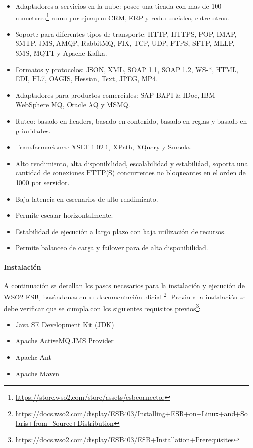 \begin{itemize}
  \item Adaptadores a servicios en la nube: posee una tienda con mas de 100 conectores\footnote{\url{https://store.wso2.com/store/assets/esbconnector}} como por ejemplo: CRM, ERP y redes sociales, entre otros.
  \item Soporte para diferentes tipos de transporte: HTTP, HTTPS, POP, IMAP, SMTP, JMS, AMQP, RabbitMQ, FIX, TCP, UDP, FTPS, SFTP, MLLP, SMS, MQTT y Apache Kafka.
  \item Formatos y protocolos: JSON, XML, SOAP 1.1, SOAP 1.2, WS-*, HTML, EDI, HL7, OAGIS, Hessian, Text, JPEG, MP4.
  \item Adaptadores para productos comerciales: SAP BAPI \& IDoc, IBM WebSphere MQ, Oracle AQ y MSMQ.
  \item Ruteo: basado en headers, basado en contenido, basado en reglas y basado en prioridades.
  \item Transformaciones: XSLT 1.0\/2.0, XPath, XQuery y Smooks.
  \item Alto rendimiento, alta disponibilidad, escalabilidad y estabilidad, soporta una cantidad de conexiones HTTP(S) concurrentes no bloqueantes en el orden de 1000 por servidor.
  \item Baja latencia en escenarios de alto rendimiento.
  \item Permite escalar horizontalmente.
  \item Estabilidad de ejecución a largo plazo con baja utilización de recursos.
  \item Permite balanceo de carga y failover para  de alta disponibilidad.
\end{itemize}


\paragraph{Instalación}

A continuación se detallan los pasos necesarios para la instalación y ejecución de WSO2 ESB, basándonos en su documentación oficial \footnote{\url{https://docs.wso2.com/display/ESB403/Installing+ESB+on+Linux+and+Solaris+from+Source+Distribution}}.  Previo a la instalación se debe verificar que se cumpla con los siguientes requisitos previos\footnote{\url{https://docs.wso2.com/display/ESB403/ESB+Installation+Prerequisites}}:

\begin{itemize}
  \item Java SE Development Kit (JDK)
  \item Apache ActiveMQ JMS Provider
  \item Apache Ant
  \item Apache Maven
\end{itemize}

